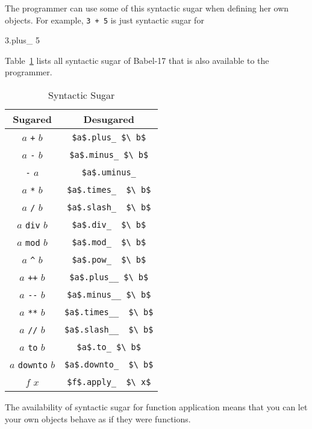\documentclass[11pt]{amsart}
\newcommand{\babelsrc}[1] {\lstinline!#1!}
\begin{document}
The programmer can use some of this syntactic sugar when defining her own objects. For example, \texttt{3 + 5} is just syntactic sugar for 
\begin{babellisting}
3.plus_ 5
\end{babellisting} 
Table~\ref{tab:syntacticsugar} lists all syntactic sugar of Babel-17 that is also available to the programmer. 
\begin{table}
\caption{Syntactic Sugar}
\begin{tabular}{c|c}
\textbf{Sugared} & \textbf{Desugared} \\\hline\hline
$a$ \verb!+! $b$ & \babelsrc{$a$.plus_ $\ b$} \\\hline
$a$ \verb!-! $b$ & \babelsrc{$a$.minus_ $\ b$} \\\hline
\verb!-! $a$ & \babelsrc{$a$.uminus_} \\\hline
$a$ \verb!*! $b$ & \babelsrc{$a$.times_  $\ b$} \\\hline
$a$ \verb!/! $b$ & \babelsrc{$a$.slash_  $\ b$} \\\hline
$a$ \verb!div! $b$ & \babelsrc{$a$.div_  $\ b$} \\\hline
$a$ \verb!mod! $b$ & \babelsrc{$a$.mod_  $\ b$} \\\hline
$a$ \verb+^+ $b$ & \babelsrc{$a$.pow_  $\ b$} \\\hline
$a$ \verb!++! $b$ & \babelsrc{$a$.plus__ $\ b$} \\\hline
$a$ \verb!--! $b$ & \babelsrc{$a$.minus__ $\ b$} \\\hline
$a$ \verb!**! $b$ & \babelsrc{$a$.times__  $\ b$}\\\hline
$a$ \verb!//! $b$ & \babelsrc{$a$.slash__  $\ b$}\\\hline
$a$ \verb!to! $b$ & \babelsrc{$a$.to_ $\ b$}\\\hline
$a$ \verb!downto! $b$ & \babelsrc{$a$.downto_  $\ b$}\\\hline 
$f$ $x$ &  \babelsrc{$f$.apply_  $\ x$}
\end{tabular}
\label{tab:syntacticsugar}
\end{table}
The availability of syntactic sugar for function application means that you can let your own objects behave as if they were functions. 
\end{document}
